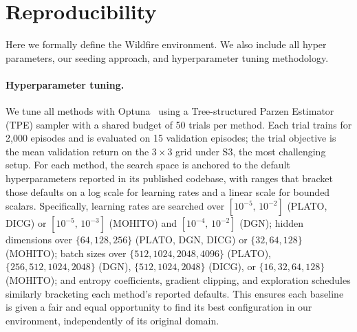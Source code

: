 
\section{Reproducibility}

Here we formally define the Wildfire environment. We also include all hyper parameters, our seeding approach, and hyperparameter tuning methodology. 


\paragraph{Hyperparameter tuning.}
We tune all methods with Optuna~\cite{akiba2019optuna} using a Tree-structured Parzen Estimator (TPE) sampler with a shared budget of 50 trials per method.
Each trial trains for 2{,}000 episodes and is evaluated on 15 validation episodes; the trial objective is the mean validation return on the $3\times 3$ grid under S3, the most challenging setup.
For each method, the search space is anchored to the default hyperparameters reported in its published codebase, with ranges that bracket those defaults on a log scale for learning rates and a linear scale for bounded scalars.
Specifically, learning rates are searched over $[10^{-5},\,10^{-2}]$ (PLATO, DICG) or $[10^{-5},\,10^{-3}]$ (MOHITO) and $[10^{-4},\,10^{-2}]$ (DGN); hidden dimensions over $\{64, 128, 256\}$ (PLATO, DGN, DICG) or $\{32, 64, 128\}$ (MOHITO); batch sizes over $\{512, 1024, 2048, 4096\}$ (PLATO), $\{256, 512, 1024, 2048\}$ (DGN), $\{512, 1024, 2048\}$ (DICG), or $\{16, 32, 64, 128\}$ (MOHITO); and entropy coefficients, gradient clipping, and exploration schedules similarly bracketing each method's reported defaults.
This ensures each baseline is given a fair and equal opportunity to find its best configuration in our environment, independently of its original domain.

